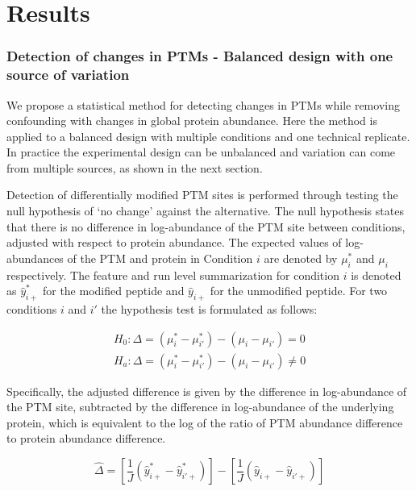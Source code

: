 \documentclass[mcp]{article}
\numberwithin{table}{section}
\begin{document}
\section*{Results}

\subsubsection*{Detection of changes in PTMs - Balanced design with one source of variation}
\label{sec:adjustment_summary}

We propose a statistical method for detecting changes in PTMs while removing confounding with changes in global protein abundance. Here the method is applied to a balanced design with multiple conditions and one technical replicate. In practice the experimental design can be unbalanced and variation can come from multiple sources, as shown in the next section.

Detection of differentially modified PTM sites is performed through testing the null hypothesis of ‘no change’ against the alternative. The null hypothesis states that there is no difference in log-abundance of the PTM site between conditions, adjusted with respect to protein abundance. The expected values of log-abundances of the PTM and protein in Condition $i$ are denoted by $\mu_{i}^{\ast}$ and $\mu_{i}$ respectively. The feature and run level summarization for condition $i$ is denoted as $\hat{y}_{i+}^{\ast}$ for the modified peptide and $\hat{y}_{i+}$ for the unmodified peptide. For two conditions $i$ and $i'$ the hypothesis test is formulated as follows:

\begin{equation}
\begin{aligned}
H_{0}: \Delta = ( \mu_{i}^{\ast} - \mu_{i'}^{\ast} ) - ( \mu_{i} - \mu_{i'} ) = 0 \\
H_{a}: \Delta = ( \mu_{i}^{\ast} - \mu_{i'}^{\ast} ) - ( \mu_{i} - \mu_{i'} ) \neq 0
\end{aligned}
\label{eq_1}
\end{equation}

Specifically, the adjusted difference is given by the difference in log-abundance of the PTM site, subtracted by the difference in log-abundance of the underlying protein, which is equivalent to the log of the ratio of PTM abundance difference to protein abundance difference. 

\begin{equation}
\hat{\Delta} = \left[ \frac{1}{J} \left( \hat{y}_{i+}^{\ast} - \hat{y}_{i'+}^{\ast} \right) \right] - \left[ \frac{1}{J} \left( \hat{y}_{i+} - \hat{y}_{i'+} \right) \right]
\end{equation}
\end{document}
